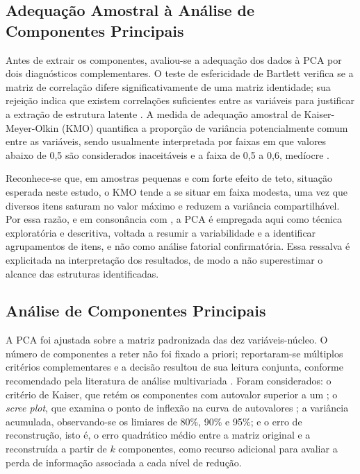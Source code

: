 \subsection{Adequação Amostral à Análise de Componentes Principais}
\label{sec:adequacao}

Antes de extrair os componentes, avaliou-se a adequação dos dados à PCA por dois diagnósticos complementares. O teste de esfericidade de Bartlett verifica se a matriz de correlação difere significativamente de uma matriz identidade; sua rejeição indica que existem correlações suficientes entre as variáveis para justificar a extração de estrutura latente \cite{bartlett1950}. A medida de adequação amostral de Kaiser-Meyer-Olkin (KMO) quantifica a proporção de variância potencialmente comum entre as variáveis, sendo usualmente interpretada por faixas em que valores abaixo de 0{,}5 são considerados inaceitáveis e a faixa de 0{,}5 a 0{,}6, medíocre \cite{kaiser1974,field2018}.

Reconhece-se que, em amostras pequenas e com forte efeito de teto, situação esperada neste estudo, o KMO tende a se situar em faixa modesta, uma vez que diversos itens saturam no valor máximo e reduzem a variância compartilhável. Por essa razão, e em consonância com , a PCA é empregada aqui como técnica exploratória e descritiva, voltada a resumir a variabilidade e a identificar agrupamentos de itens, e não como análise fatorial confirmatória. Essa ressalva é explicitada na interpretação dos resultados, de modo a não superestimar o alcance das estruturas identificadas.

\subsection{Análise de Componentes Principais}
\label{sec:pca}

A PCA foi ajustada sobre a matriz padronizada das dez variáveis-núcleo. O número de componentes a reter não foi fixado a priori; reportaram-se múltiplos critérios complementares e a decisão resultou de sua leitura conjunta, conforme recomendado pela literatura de análise multivariada \cite{hair2019}. Foram considerados: o critério de Kaiser, que retém os componentes com autovalor superior a um \cite{kaiser1960}; o \textit{scree plot}, que examina o ponto de inflexão na curva de autovalores \cite{cattell1966}; a variância acumulada, observando-se os limiares de 80\%, 90\% e 95\%; e o erro de reconstrução, isto é, o erro quadrático médio entre a matriz original e a reconstruída a partir de \(k\) componentes, como recurso adicional para avaliar a perda de informação associada a cada nível de redução.

